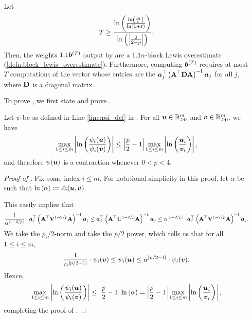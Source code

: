 \documentclass[11pt]{article}
\numberwithin{equation}{section}
\begin{document}
\begin{lemma}
\label{lemma:contract_alg}
Let
\begin{align*}
    T \ge \frac{\ln\left(\frac{\ln\left(\frac{m}{n}\right)}{\ln\left(1+\varepsilon\right)}\right)}{\ln\left(\left\lvert \frac{2}{2-p} \right\rvert\right)}.
\end{align*}
Then, the weights $1.1\bm{b}^{(T)}$ output by   are a $1.1n$-block Lewis overestimate (\cref{defn:block_lewis_overestimate}). Furthermore, computing $\bm{b}^{(T)}$ requires at most $T$ computations of the vector whose entries are the $\bm{a}_j^{\top}\left(\mathbf{A}^{\top}\mathbf{D}\mathbf{A}\right)^{-1}\bm{a}_j$ for all $j$, where $\mathbf{D}$ is a diagonal matrix.
\end{lemma}

To prove , we first state and prove .

\begin{lemma}
\label{lemma:lewis_contract_easy}
Let $\psi$ be as defined in Line \ref{line:psi_def} in . For all $\bm{u} \in \mathbb{R}^{m}_{\ge 0}$ and $\bm{v} \in \mathbb{R}^{m}_{\ge 0}$, we have
\begin{align*}
    \max_{1 \le i \le m} \left\lvert \ln\left(\frac{\psi_i(\bm{u})}{\psi_i(\bm{v})}\right) \right\rvert \le \left\lvert \frac{p}{2}-1 \right\rvert\max_{1 \le i \le m} \left\lvert \ln\left(\frac{\bm{u}_i}{\bm{v}_i}\right) \right\rvert,
\end{align*}
and therefore $\psi(\bm{u})$ is a contraction whenever $0 < p < 4$.
\end{lemma}
\begin{proof}[Proof of ]
Fix some index $i \le m$. For notational simplicity in this proof, let $\alpha$ be such that $\ln\left(\alpha\right) \coloneqq \triangle(\bm{u},\bm{v})$.

This easily implies that
\begin{align*}
    \frac{1}{\alpha^{\left\lvert 1-2/p \right\rvert}} \cdot \bm{a}_j^{\top}\left(\mathbf{A}^{\top}\mathbf{V}^{1-2/p}\mathbf{A}\right)^{-1}\bm{a}_j \le \bm{a}_j^{\top}\left(\mathbf{A}^{\top}\mathbf{U}^{1-2/p}\mathbf{A}\right)^{-1}\bm{a}_j \le \alpha^{\left\lvert 1-2/p \right\rvert} \cdot \bm{a}_j^{\top}\left(\mathbf{A}^{\top}\mathbf{V}^{1-2/p}\mathbf{A}\right)^{-1}\bm{a}_j.
\end{align*}
We take the $p_i/2$-norm and take the $p/2$ power, which tells us that for all $1 \le i \le m$,
\begin{align*}
    \frac{1}{\alpha^{\left\lvert p/2-1 \right\rvert}} \cdot \psi_i(\bm{v}) \le \psi_i(\bm{u}) \le \alpha^{\left\lvert p/2-1 \right\rvert} \cdot \psi_i(\bm{v}).
\end{align*}
Hence,
\begin{align*}
    \max_{1 \le i \le m} \left\lvert \ln\left(\frac{\psi_i(\bm{u})}{\psi_i(\bm{v})}\right) \right\rvert \le \left\lvert \frac{p}{2}-1 \right\rvert\ln\left(\alpha\right) = \left\lvert \frac{p}{2}-1 \right\rvert\max_{1 \le i \le m} \left\lvert \ln\left(\frac{\bm{u}_i}{\bm{v}_i}\right) \right\rvert,
\end{align*}
completing the proof of .
\end{proof}
\end{document}
